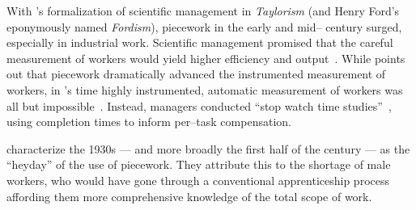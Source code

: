 \documentclass[trackingWork]{subfiles}
\begin{document}
{With \citeauthor{taylor1914principles}'s formalization of scientific management in \textit{Taylorism}
(and Henry Ford's eponymously named \textit{Fordism}),
piecework in the early and mid-- century surged, especially in industrial work.}
Scientific management promised that the careful measurement of workers would yield
higher efficiency and output~\cite{taylor1914principles,towardsGlobalFordism}.
While \citeauthor{Brown01041990} points out that
piecework dramatically advanced the instrumented measurement of workers,
in \citeauthor{taylor1914principles}'s time highly instrumented,
automatic measurement of workers was all but impossible~\cite{Brown01041990}.
Instead, managers conducted ``stop watch time studies''~\cite{nadworny1955scientific},
using completion times to inform per--task compensation.



\citeauthor{hart2013rise} characterize the 1930s
--- and more broadly the first half of the  century ---
as the ``heyday'' of the use of piecework.
They attribute this to the shortage of male workers,
who would have gone through a conventional apprenticeship process
affording them more comprehensive knowledge of the total scope of work.

\end{document}
